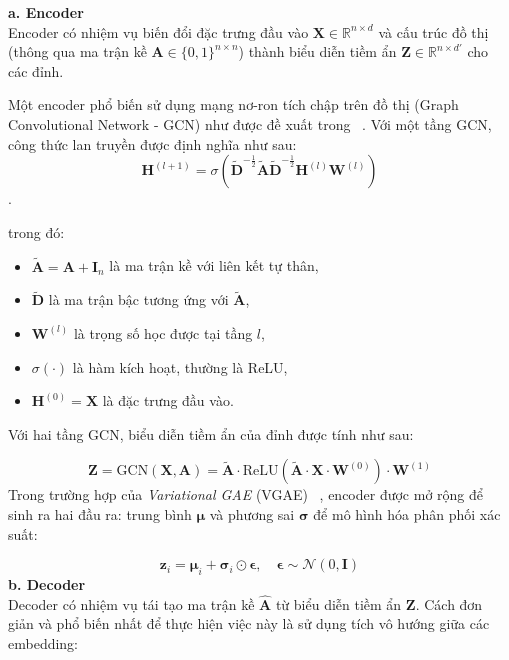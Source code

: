 \documentclass[a4paper]{article}
\begin{document}
\textbf{a.  Encoder}\\
Encoder có nhiệm vụ biến đổi đặc trưng đầu vào $\mathbf{X} \in \mathbb{R}^{n \times d}$ và cấu trúc đồ thị (thông qua ma trận kề $\mathbf{A} \in \{0,1\}^{n \times n}$) thành biểu diễn tiềm ẩn $\mathbf{Z} \in \mathbb{R}^{n \times d'}$ cho các đỉnh.

Một encoder phổ biến sử dụng mạng nơ-ron tích chập trên đồ thị (Graph Convolutional Network - GCN) như được đề xuất trong ~\cite{kipf2016semi}. Với một tầng GCN, công thức lan truyền được định nghĩa như sau:
\begin{equation}
\mathbf{H}^{(l+1)} = \sigma\left( \tilde{\mathbf{D}}^{-\frac{1}{2}} \tilde{\mathbf{A}} \tilde{\mathbf{D}}^{-\frac{1}{2}} \mathbf{H}^{(l)} \mathbf{W}^{(l)} \right)
\end{equation}.



trong đó:

\begin{itemize}
  \item $\tilde{\mathbf{A}} = \mathbf{A} + \mathbf{I}_n$ là ma trận kề với liên kết tự thân,
  \item $\tilde{\mathbf{D}}$ là ma trận bậc tương ứng với $\tilde{\mathbf{A}}$,
  \item $\mathbf{W}^{(l)}$ là trọng số học được tại tầng $l$,
  \item $\sigma(\cdot)$ là hàm kích hoạt, thường là ReLU,
  \item $\mathbf{H}^{(0)} = \mathbf{X}$ là đặc trưng đầu vào.
\end{itemize}

Với hai tầng GCN, biểu diễn tiềm ẩn của đỉnh được tính như sau:

\begin{equation}
\mathbf{Z} = \text{GCN}(\mathbf{X}, \mathbf{A}) = \tilde{\mathbf{A}} \cdot \text{ReLU}(\tilde{\mathbf{A}} \cdot \mathbf{X} \cdot \mathbf{W}^{(0)}) \cdot \mathbf{W}^{(1)}
\end{equation}
Trong trường hợp của \textit{Variational GAE} (VGAE) ~\cite{kipf2016variational}, encoder được mở rộng để sinh ra hai đầu ra: trung bình $\boldsymbol{\mu}$ và phương sai $\boldsymbol{\sigma}$ để mô hình hóa phân phối xác suất:

\begin{equation}
\mathbf{z}_i = \boldsymbol{\mu}_i + \boldsymbol{\sigma}_i \odot \boldsymbol{\epsilon}, \quad \boldsymbol{\epsilon} \sim \mathcal{N}(0, \mathbf{I})
\end{equation}
\textbf{b.  Decoder}\\
Decoder có nhiệm vụ tái tạo ma trận kề $\hat{\mathbf{A}}$ từ biểu diễn tiềm ẩn $\mathbf{Z}$. Cách đơn giản và phổ biến nhất để thực hiện việc này là sử dụng tích vô hướng giữa các embedding:
\end{document}
